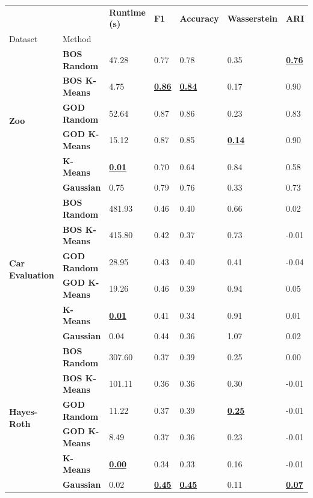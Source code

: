 \documentclass[a4paper,12pt]{article}
\begin{document}
\begin{table}
\begin{adjustbox}{width=\columnwidth}
\begin{tabular}{lllllll}
\toprule
 &  & \textbf{Runtime (s)} & \textbf{F1} & \textbf{Accuracy} & \textbf{Wasserstein} & \textbf{ARI} \\
Dataset & Method &  &  &  &  &  \\
\midrule
\multirow[t]{6}{*}{\textbf{Zoo}} & \textbf{BOS Random} & 47.28 & 0.77 & 0.78 & 0.35 & \textbf{\underline{0.76}} \\
\textbf{} & \textbf{BOS K-Means} & 4.75 & \textbf{\underline{0.86}} & \textbf{\underline{0.84}} & 0.17 & 0.90 \\
\textbf{} & \textbf{GOD Random} & 52.64 & 0.87 & 0.86 & 0.23 & 0.83 \\
\textbf{} & \textbf{GOD K-Means} & 15.12 & 0.87 & 0.85 & \textbf{\underline{0.14}} & 0.90 \\
\textbf{} & \textbf{K-Means} & \textbf{\underline{0.01}} & 0.70 & 0.64 & 0.84 & 0.58 \\
\textbf{} & \textbf{Gaussian} & 0.75 & 0.79 & 0.76 & 0.33 & 0.73 \\
\cline{1-7}
\multirow[t]{6}{*}{\textbf{Car Evaluation}} & \textbf{BOS Random} & 481.93 & 0.46 & 0.40 & 0.66 & 0.02 \\
\textbf{} & \textbf{BOS K-Means} & 415.80 & 0.42 & 0.37 & 0.73 & -0.01 \\
\textbf{} & \textbf{GOD Random} & 28.95 & 0.43 & 0.40 & 0.41 & -0.04 \\
\textbf{} & \textbf{GOD K-Means} & 19.26 & 0.46 & 0.39 & 0.94 & 0.05 \\
\textbf{} & \textbf{K-Means} & \textbf{\underline{0.01}} & 0.41 & 0.34 & 0.91 & 0.01 \\
\textbf{} & \textbf{Gaussian} & 0.04 & 0.44 & 0.36 & 1.07 & 0.02 \\
\cline{1-7}
\multirow[t]{6}{*}{\textbf{Hayes-Roth}} & \textbf{BOS Random} & 307.60 & 0.37 & 0.39 & 0.25 & 0.00 \\
\textbf{} & \textbf{BOS K-Means} & 101.11 & 0.36 & 0.36 & 0.30 & -0.01 \\
\textbf{} & \textbf{GOD Random} & 11.22 & 0.37 & 0.39 & \textbf{\underline{0.25}} & -0.01 \\
\textbf{} & \textbf{GOD K-Means} & 8.49 & 0.37 & 0.36 & 0.23 & -0.01 \\
\textbf{} & \textbf{K-Means} & \textbf{\underline{0.00}} & 0.34 & 0.33 & 0.16 & -0.01 \\
\textbf{} & \textbf{Gaussian} & 0.02 & \textbf{\underline{0.45}} & \textbf{\underline{0.45}} & 0.11 & \textbf{\underline{0.07}} \\

\end{tabular}
\end{adjustbox}
\end{table}
\end{document}
